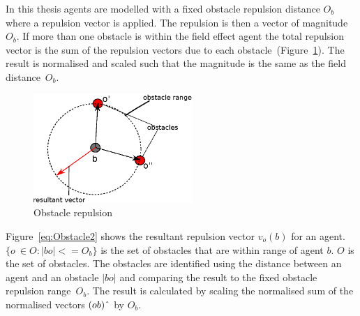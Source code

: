 \documentclass[10pt,journal,letterpaper,twoside]{IEEEtran}
\begin{document}
In this thesis agents are modelled with a fixed obstacle repulsion distance $O_b$ where a repulsion vector is applied. The repulsion is then a vector of magnitude $O_b$. If more than one obstacle is within the field effect agent the total repulsion vector is the sum of the repulsion vectors due to each obstacle~(Figure~\ref{methods:Obstacle1}). The result is normalised and scaled such that the magnitude is the same as the field distance~$O_b$.

\begin{figure}
\begin{center}
\includegraphics[width=6cm]{figures/Obstacle1}
\end{center}
\caption{Obstacle repulsion \label{methods:Obstacle1}}
\end{figure}




Figure~\ref{eq:Obstacle2} shows the resultant repulsion vector $v_o(b)$ for an agent. $\{o\ \in O:|bo| <= O_b\}$ is the set of obstacles that are within range of agent $b$. $O$ is the set of obstacles. The obstacles are identified using the distance between an agent and an obstacle $|bo|$ and comparing the result to the fixed obstacle repulsion range~$O_b$. The result is calculated by scaling the normalised sum of the normalised vectors $(ob)\string^$ by $O_b$.
\end{document}
